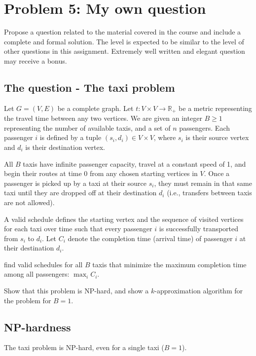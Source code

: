 \section*{Problem 5: My own question}
Propose a question related to the material covered in the course and
include a complete and formal solution. The level is expected to be similar
to the level of other questions in this assignment. Extremely well written and
elegant question may receive a bonus.

\subsection*{The question - The taxi problem}
Let $G = (V, E)$ be a complete graph. Let $t: V \times V \to \mathbb{R}_+$ be a metric representing the travel time between any two vertices. We are given an integer $B \geq 1$ representing the number of available taxis, and a set of $n$ passengers. Each passenger $i$ is defined by a tuple $(s_i, d_i) \in V \times V$, where $s_i$ is their source vertex and $d_i$ is their destination vertex.

All $B$ taxis have infinite passenger capacity, travel at a constant speed of 1, and begin their routes at time $0$ from any chosen starting vertices in $V$. Once a passenger is picked up by a taxi at their source $s_i$, they must remain in that same taxi until they are dropped off at their destination $d_i$ (i.e., transfers between taxis are not allowed).

A valid schedule defines the starting vertex and the sequence of visited vertices for each taxi over time such that every passenger $i$ is successfully transported from $s_i$ to $d_i$. Let $C_i$ denote the completion time (arrival time) of passenger $i$ at their destination $d_i$.

find valid schedules for all $B$ taxis that minimize the maximum completion time among all passengers: $\max_{i} C_i$.

Show that this problem is NP-hard, and show a $k$-approximation algorithm for the problem for $B=1$.

\subsection*{NP-hardness}

\begin{theorem}
The taxi problem is NP-hard, even for a single taxi ($B = 1$).
\end{theorem}

